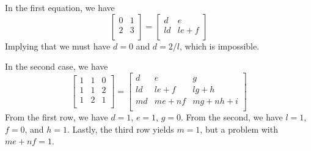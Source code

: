 \documentclass[a4paper]{article}
\begin{document}

In the first equation, we have
\[
	\begin{bmatrix}
		0 & 1 \\
		2 & 3 \\
	\end{bmatrix}
	=
	\begin{bmatrix}
		d & e \\
		ld & le + f \\
	\end{bmatrix}
\]
Implying that we must have \(d = 0\) and \(d = 2/l\), which is impossible.

In the second case, we have
\[
	\begin{bmatrix}
		1 & 1 & 0 \\
		1 & 1 & 2 \\
		1 & 2 & 1 \\
	\end{bmatrix}
	=
	\begin{bmatrix}
		d & e & g \\
		ld & le + f & lg + h \\
		md & me + nf & mg + nh + i \\
	\end{bmatrix}
\]
From the first row, we have \(d = 1\), \(e = 1\), \(g = 0\). From the second, we have \(l = 1\), \(f = 0\), and \(h = 1\). Lastly, the third row yields \(m = 1\), but a problem with \(me + nf = 1\).
\end{document}
